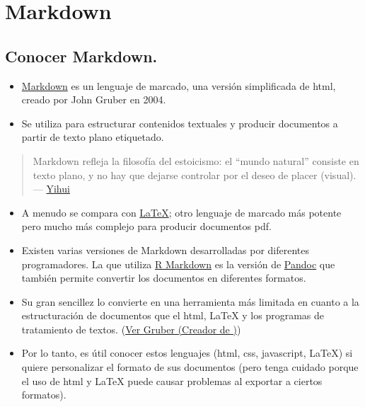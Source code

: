 \documentclass[
]{article}
\begin{document}
\hypertarget{markdown}{%
\section{Markdown}\label{markdown}}

\hypertarget{conocer-markdown.}{%
\subsection{Conocer Markdown.}\label{conocer-markdown.}}

\begin{itemize}
\item
  \href{https://daringfireball.net/projects/markdown/syntax}{Markdown}
  es un lenguaje de marcado, una versión simplificada de html, creado
  por John Gruber en 2004.
\item
  Se utiliza para estructurar contenidos textuales y producir documentos
  a partir de texto plano etiquetado.
\end{itemize}

\begin{quote}
Markdown refleja la filosofía del estoicismo: el ``mundo natural''
consiste en texto plano, y no hay que dejarse controlar por el deseo de
placer (visual). ---
\href{https://bookdown.org/yihui/rmarkdown-cookbook/formatting.html}{Yihui}
\end{quote}

\begin{itemize}
\item
  A menudo se compara con \href{https://www.latex-project.org/}{LaTeX};
  otro lenguaje de marcado más potente pero mucho más complejo para
  producir documentos pdf.
\item
  Existen varias versiones de Markdown desarrolladas por diferentes
  programadores. La que utiliza
  \href{https://rmarkdown.rstudio.com/authoring_pandoc_markdown.html\%23raw-tex\#pandoc_markdown}{R
  Markdown} es la versión de
  \href{https://pandoc.org/MANUAL.html}{Pandoc} que también permite
  convertir los documentos en diferentes formatos.
\item
  Su gran sencillez lo convierte en una herramienta más limitada en
  cuanto a la estructuración de documentos que el html, LaTeX y los
  programas de tratamiento de textos.
  (\href{https://daringfireball.net/projects/markdown/syntax\#philosophy}{Ver
  Gruber (Creador de )})
\item
  Por lo tanto, es útil conocer estos lenguajes (html, css, javascript,
  LaTeX) si quiere personalizar el formato de sus documentos (pero tenga
  cuidado porque el uso de html y LaTeX puede causar problemas al
  exportar a ciertos formatos).
\end{itemize}
\end{document}
